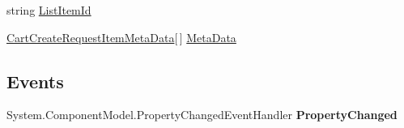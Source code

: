 \begin{DoxyCompactItemize}
\begin{DoxyCompactList}\small\item\em \end{DoxyCompactList}\item 
\hypertarget{class_price___comparison_1_1amazon_1_1ecs_1_1_cart_create_request_item_a5ec4ff93b8573c156cb96ffdf941038a}{string \hyperlink{class_price___comparison_1_1amazon_1_1ecs_1_1_cart_create_request_item_a5ec4ff93b8573c156cb96ffdf941038a}{List\-Item\-Id}}\label{class_price___comparison_1_1amazon_1_1ecs_1_1_cart_create_request_item_a5ec4ff93b8573c156cb96ffdf941038a}

\begin{DoxyCompactList}\small\item\em \end{DoxyCompactList}\item 
\hypertarget{class_price___comparison_1_1amazon_1_1ecs_1_1_cart_create_request_item_a6c0bce710c5b45a3fa207220c76efb42}{\hyperlink{class_price___comparison_1_1amazon_1_1ecs_1_1_cart_create_request_item_meta_data}{Cart\-Create\-Request\-Item\-Meta\-Data}\mbox{[}$\,$\mbox{]} \hyperlink{class_price___comparison_1_1amazon_1_1ecs_1_1_cart_create_request_item_a6c0bce710c5b45a3fa207220c76efb42}{Meta\-Data}}\label{class_price___comparison_1_1amazon_1_1ecs_1_1_cart_create_request_item_a6c0bce710c5b45a3fa207220c76efb42}

\begin{DoxyCompactList}\small\item\em \end{DoxyCompactList}\end{DoxyCompactItemize}
\subsection*{Events}
\begin{DoxyCompactItemize}
\item 
\hypertarget{class_price___comparison_1_1amazon_1_1ecs_1_1_cart_create_request_item_a8482c94327d61595b37c6604bd30bb8d}{System.\-Component\-Model.\-Property\-Changed\-Event\-Handler {\bfseries Property\-Changed}}\label{class_price___comparison_1_1amazon_1_1ecs_1_1_cart_create_request_item_a8482c94327d61595b37c6604bd30bb8d}

\end{DoxyCompactItemize}
